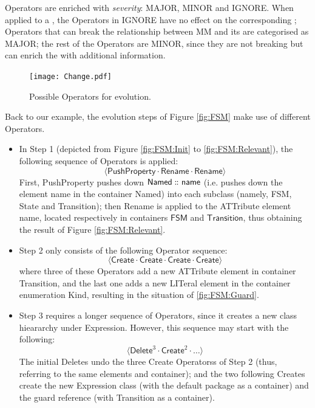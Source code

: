 \textsf{Operator}s are enriched with \emph{severity}: \textsf{MAJOR}, 
\textsf{MINOR} and \textsf{IGNORE}. 
When applied to a \metamodel, the \textsf{Operator}s in \textsf{IGNORE} have no 
effect on the corresponding \viewtypes; \textsf{Operator}s that can break the 
relationship between \textsf{MM} and its \viewtypes are categorised as \textsf{MAJOR}; 
the rest of the \textsf{Operator}s are \textsf{MINOR}, since they are not 
breaking but can enrich the \viewtypes with additional information.

\begin{figure}[t]
    \centering
    \texttt{[image: Change.pdf]}
    \caption{Possible \textsf{Operator}s for \metamodel evolution.}
    \label{fig:Operator}
\end{figure}

Back to our example, the evolution steps of Figure \ref{fig:FSM} make use of different \textsf{Operator}s.
\begin{itemize}
	\item In Step 1 (depicted from Figure \ref{fig:FSM:Init} to \ref{fig:FSM:Relevant}),
	the following sequence of \textsf{Operator}s is applied:
	$$\langle \mathsf{PushProperty} \cdot \mathsf{Rename} \cdot \mathsf{Rename} \rangle$$
	First, \textsf{PushProperty} pushes down $\mathsf{Named} \,\colon\!\!\!\colon \mathsf{name}$
	(i.e. pushes down the \textsf{element} \textsf{name} in the \textsf{container}
	\textsf{Named})
	into each subclass (namely, \textsf{FSM}, \textsf{State} and \textsf{Transition});
	then \textsf{Rename} is applied to the \textsf{ATT}ribute \textsf{element} 
	\textsf{name}, located respectively in \textsf{container}s $\mathsf{FSM}$ and 
	$\mathsf{Transition}$, thus obtaining the result of Figure \ref{fig:FSM:Relevant}.
	
	\item Step 2 only consists of the following \textsf{Operator} sequence:
	$$\langle \mathsf{Create} \cdot \mathsf{Create} \cdot \mathsf{Create} \cdot \mathsf{Create} \rangle$$
	where three of these \textsf{Operator}s add a new \textsf{ATT}ribute \textsf{element}
	in \textsf{container} \textsf{Transition}, and the last one adds a new 
	\textsf{LIT}eral \textsf{element} in the \textsf{container} enumeration \textsf{Kind},
	resulting in the situation of \autoref{fig:FSM:Guard}.
	
	\item Step 3 requires a longer sequence of \textsf{Operator}s, since it creates
	a new class hieararchy under \textsf{Expression}. However, this sequence may
	start with the following:
	$$\langle \mathsf{Delete}^3 \cdot \mathsf{Create}^2 \cdot \ldots \rangle$$
	The initial \textsf{Delete}s undo the three \textsf{Create} \textsf{Operators}s 
	of Step 2
	(thus, referring to the same \textsf{element}s and \textsf{container}); and
	the two following \textsf{Create}s create the new \textsf{Expression} class
	(with the default package as a \textsf{container}) and the \textsf{guard}
	reference (with \textsf{Transition} as a \textsf{container}).
\end{itemize}
